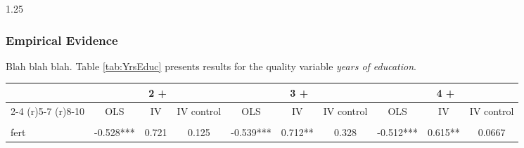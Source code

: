 \documentclass{article}[11pt,subeqn]
\begin{document}
\begin{spacing}{1.25}
\subsubsection{Empirical Evidence}
\label{scn:EE}
Blah blah blah.  Table \ref{tab:YrsEduc} presents results for the quality variable \emph{years of education}.
\begin{sidewaystable}[!htbp]
\caption{Q-Q specification with years of schooling as quality}
\label{tab:YrsEduc}
\begin{center}
\begin{tabular}{lccccccccc} \toprule 
 & \multicolumn{3}{c}{2 +} &   \multicolumn{3}{c}{3 +} &  \multicolumn{3}{c}{4 +} \\  \cmidrule(r){2-4} \cmidrule(r){5-7} \cmidrule(r){8-10} 
& OLS & IV & IV control & OLS & IV & IV control & OLS & IV & IV control \\ \midrule
\begin{footnotesize}\end{footnotesize}&\begin{footnotesize}\end{footnotesize}&\begin{footnotesize}\end{footnotesize}&\begin{footnotesize}\end{footnotesize}&\begin{footnotesize}\end{footnotesize}&\begin{footnotesize}\end{footnotesize}&\begin{footnotesize}\end{footnotesize}&\begin{footnotesize}\end{footnotesize}&\begin{footnotesize}\end{footnotesize}&\begin{footnotesize}\end{footnotesize}\\
fert & -0.528*** & 0.721 & 0.125 & -0.539*** & 0.712** & 0.328 & -0.512*** & 0.615** & 0.0667 \\

\end{tabular}
\end{center}
\end{sidewaystable}
\end{spacing}
\end{document}
